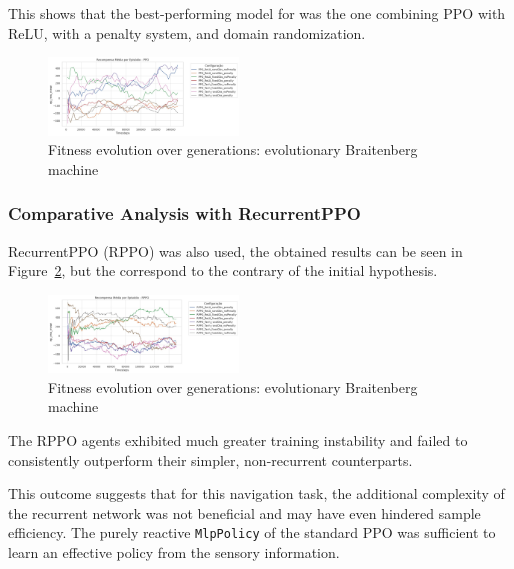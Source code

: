 \documentclass[final,5p,times,twocolumn,authoryear]{elsarticle}
\begin{document}
This shows that the best-performing model for was the one combining PPO with ReLU, with a penalty system, and domain randomization.

\begin{figure}[H]
    \centering
    \includegraphics[width=0.45\textwidth]{figures/PPO_tanh.jpeg}
    \caption{Fitness evolution over generations: evolutionary Braitenberg machine}
    \label{fig:ppo_tanh}
\end{figure}

\subsubsection{Comparative Analysis with RecurrentPPO}

RecurrentPPO (RPPO) was also used, the obtained results can be seen in Figure~\ref{fig:rppo}, but the correspond to the contrary of the initial hypothesis.

\begin{figure}[H]
    \centering
    \includegraphics[width=0.45\textwidth]{figures/RPPO_Relu.jpeg}
    \caption{Fitness evolution over generations: evolutionary Braitenberg machine}
    \label{fig:rppo}
\end{figure}

The RPPO agents exhibited much greater training instability and failed to consistently outperform their simpler, non-recurrent counterparts. 

This outcome suggests that for this navigation task, the additional complexity of the recurrent network was not beneficial and may have even hindered sample efficiency. The purely reactive \texttt{MlpPolicy} of the standard PPO was sufficient to learn an effective policy from the sensory information.

\end{document}
